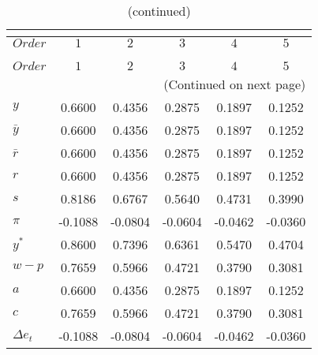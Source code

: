  
\begin{center}
\begin{longtable}{lccccc} 
\caption{COEFFICIENTS OF AUTOCORRELATION}\\
 \label{Table:th_autocorr_matrix}\\
\toprule 
$Order       $	 & 	 $          1$	 & 	 $          2$	 & 	 $          3$	 & 	 $          4$	 & 	 $          5$\\
\midrule \endfirsthead 
\caption{(continued)}\\
 \toprule \\ 
$Order       $	 & 	 $          1$	 & 	 $          2$	 & 	 $          3$	 & 	 $          4$	 & 	 $          5$\\
\midrule \endhead 
\midrule \multicolumn{6}{r}{(Continued on next page)} \\ \bottomrule \endfoot 
\bottomrule \endlastfoot 
$y           $	 & 	     0.6600	 & 	     0.4356	 & 	     0.2875	 & 	     0.1897	 & 	     0.1252 \\ 
${\bar y}    $	 & 	     0.6600	 & 	     0.4356	 & 	     0.2875	 & 	     0.1897	 & 	     0.1252 \\ 
${\bar r}    $	 & 	     0.6600	 & 	     0.4356	 & 	     0.2875	 & 	     0.1897	 & 	     0.1252 \\ 
$r           $	 & 	     0.6600	 & 	     0.4356	 & 	     0.2875	 & 	     0.1897	 & 	     0.1252 \\ 
$s           $	 & 	     0.8186	 & 	     0.6767	 & 	     0.5640	 & 	     0.4731	 & 	     0.3990 \\ 
${\pi}       $	 & 	    -0.1088	 & 	    -0.0804	 & 	    -0.0604	 & 	    -0.0462	 & 	    -0.0360 \\ 
${y^*}       $	 & 	     0.8600	 & 	     0.7396	 & 	     0.6361	 & 	     0.5470	 & 	     0.4704 \\ 
${w-p}       $	 & 	     0.7659	 & 	     0.5966	 & 	     0.4721	 & 	     0.3790	 & 	     0.3081 \\ 
$a           $	 & 	     0.6600	 & 	     0.4356	 & 	     0.2875	 & 	     0.1897	 & 	     0.1252 \\ 
$c           $	 & 	     0.7659	 & 	     0.5966	 & 	     0.4721	 & 	     0.3790	 & 	     0.3081 \\ 
$\Delta e_t  $	 & 	    -0.1088	 & 	    -0.0804	 & 	    -0.0604	 & 	    -0.0462	 & 	    -0.0360 \\ 
\end{longtable}
 \end{center}
